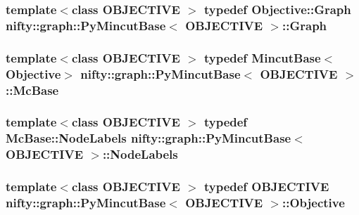 \subsubsection[{Graph}]{\setlength{\rightskip}{0pt plus 5cm}template$<$class O\+B\+J\+E\+C\+T\+I\+V\+E $>$ typedef Objective\+::\+Graph {\bf nifty\+::graph\+::\+Py\+Mincut\+Base}$<$ O\+B\+J\+E\+C\+T\+I\+V\+E $>$\+::{\bf Graph}}\label{classnifty_1_1graph_1_1PyMincutBase_a2e4ede4ebb88bade74760108d2f79652}
\hypertarget{classnifty_1_1graph_1_1PyMincutBase_a0bf9e1bc1cb78b5950ca9d470eb12428}{}
\subsubsection[{Mc\+Base}]{\setlength{\rightskip}{0pt plus 5cm}template$<$class O\+B\+J\+E\+C\+T\+I\+V\+E $>$ typedef {\bf Mincut\+Base}$<${\bf Objective}$>$ {\bf nifty\+::graph\+::\+Py\+Mincut\+Base}$<$ O\+B\+J\+E\+C\+T\+I\+V\+E $>$\+::{\bf Mc\+Base}}\label{classnifty_1_1graph_1_1PyMincutBase_a0bf9e1bc1cb78b5950ca9d470eb12428}
\hypertarget{classnifty_1_1graph_1_1PyMincutBase_add7d75786f7917e199efa4509c61f9b9}{}
\subsubsection[{Node\+Labels}]{\setlength{\rightskip}{0pt plus 5cm}template$<$class O\+B\+J\+E\+C\+T\+I\+V\+E $>$ typedef {\bf Mc\+Base\+::\+Node\+Labels} {\bf nifty\+::graph\+::\+Py\+Mincut\+Base}$<$ O\+B\+J\+E\+C\+T\+I\+V\+E $>$\+::{\bf Node\+Labels}}\label{classnifty_1_1graph_1_1PyMincutBase_add7d75786f7917e199efa4509c61f9b9}
\hypertarget{classnifty_1_1graph_1_1PyMincutBase_a0d42d028691f6bc4cc12dc98d72a551a}{}
\subsubsection[{Objective}]{\setlength{\rightskip}{0pt plus 5cm}template$<$class O\+B\+J\+E\+C\+T\+I\+V\+E $>$ typedef O\+B\+J\+E\+C\+T\+I\+V\+E {\bf nifty\+::graph\+::\+Py\+Mincut\+Base}$<$ O\+B\+J\+E\+C\+T\+I\+V\+E $>$\+::{\bf Objective}}\label{classnifty_1_1graph_1_1PyMincutBase_a0d42d028691f6bc4cc12dc98d72a551a}
\hypertarget{classnifty_1_1graph_1_1PyMincutBase_a29aa86dab1d9d51b0c53992df95f94b7}{}
